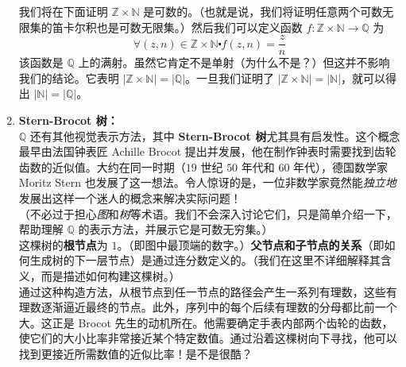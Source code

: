 \begin{example}
\begin{enumerate}[label=(\arabic*)]
              我们将在下面证明 $\mathbb{Z} \times \mathbb{N}$ 是可数的。（也就是说，我们将证明任意两个可数无限集的笛卡尔积也是可数无限集。）然后我们可以定义函数 $f : \mathbb{Z} \times \mathbb{N} \to \mathbb{Q}$ 为
              \[\forall (z, n) \in \mathbb{Z} \times \mathbb{N} \centerdot f(z, n) = \frac{z}{n}\]
              该函数是 $\mathbb{Q}$ 上的满射。虽然它肯定不是单射（为什么不是？）但这并不影响我们的结论。它表明 $|\mathbb{Z} \times \mathbb{N}| = |\mathbb{Q}|$。一旦我们证明了 $|\mathbb{Z} \times \mathbb{N}| = |\mathbb{N}|$，就可以得出 $|\mathbb{N}| = |\mathbb{Q}|$。\\
        \item \textbf{Stern-Brocot 树：}\\
              $\mathbb{Q}$ 还有其他视觉表示方法，其中 \textbf{Stern-Brocot 树}尤其具有启发性。这个概念最早由法国钟表匠 Achille Brocot 提出并发展，他在制作钟表时需要找到齿轮齿数的近似值。大约在同一时期（$19$ 世纪 $50$ 年代和 $60$ 年代），德国数学家 Moritz Stern 也发展了这一想法。令人惊讶的是，一位非数学家竟然能\emph{独立地}发展出这样一个迷人的概念来解决实际问题！\\

              （不必过于担心\emph{图}和\emph{树}等术语。我们不会深入讨论它们，只是简单介绍一下，帮助理解 $\mathbb{Q}$ 的表示方法，并展示它是可数无穷集。）\\

              这棵树的\textbf{根节点}为 $1$。（即图中最顶端的数字。）\textbf{父节点和子节点的关系}（即如何生成树的下一层节点）是通过连分数定义的。（我们在这里不详细解释其含义，而是描述如何构建这棵树。）\\

              通过这种构造方法，从根节点到任一节点的路径会产生一系列有理数，这些有理数逐渐逼近最终的节点。此外，序列中的每个后续有理数的分母都比前一个大。这正是 Brocot 先生的动机所在。他需要确定手表内部两个齿轮的齿数，使它们的大小比率非常接近某个特定数值。通过沿着这棵树向下寻找，他可以找到更接近所需数值的近似比率！是不是很酷？

              \begin{center}
\end{center}
\end{enumerate}
\end{example}
